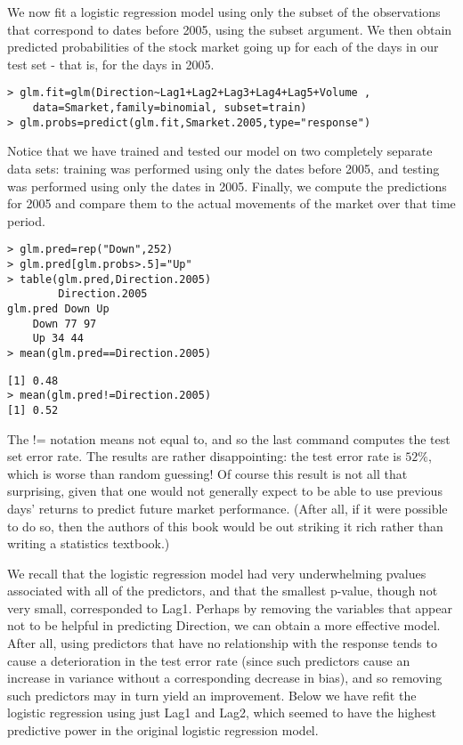 \documentclass[10pt]{article}
\begin{document}
We now fit a logistic regression model using only the subset of the observations that correspond to dates before 2005, using the subset argument. We then obtain predicted probabilities of the stock market going up for each of the days in our test set - that is, for the days in 2005.

\begin{verbatim}
> glm.fit=glm(Direction~Lag1+Lag2+Lag3+Lag4+Lag5+Volume ,
    data=Smarket,family=binomial, subset=train)
> glm.probs=predict(glm.fit,Smarket.2005,type="response")
\end{verbatim}

Notice that we have trained and tested our model on two completely separate data sets: training was performed using only the dates before 2005, and testing was performed using only the dates in 2005. Finally, we compute the predictions for 2005 and compare them to the actual movements of the market over that time period.

\begin{verbatim}
> glm.pred=rep("Down",252)
> glm.pred[glm.probs>.5]="Up"
> table(glm.pred,Direction.2005)
        Direction.2005
glm.pred Down Up
    Down 77 97
    Up 34 44
> mean(glm.pred==Direction.2005)
\end{verbatim}

\begin{verbatim}
[1] 0.48
> mean(glm.pred!=Direction.2005)
[1] 0.52
\end{verbatim}

The != notation means not equal to, and so the last command computes the test set error rate. The results are rather disappointing: the test error rate is $52 \%$, which is worse than random guessing! Of course this result is not all that surprising, given that one would not generally expect to be able to use previous days' returns to predict future market performance. (After all, if it were possible to do so, then the authors of this book would be out striking it rich rather than writing a statistics textbook.)

We recall that the logistic regression model had very underwhelming pvalues associated with all of the predictors, and that the smallest p-value, though not very small, corresponded to Lag1. Perhaps by removing the variables that appear not to be helpful in predicting Direction, we can obtain a more effective model. After all, using predictors that have no relationship with the response tends to cause a deterioration in the test error rate (since such predictors cause an increase in variance without a corresponding decrease in bias), and so removing such predictors may in turn yield an improvement. Below we have refit the logistic regression using just Lag1 and Lag2, which seemed to have the highest predictive power in the original logistic regression model.
\end{document}
